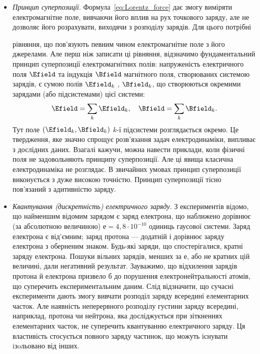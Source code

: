 \begin{itemize}

	\item \textit{Принцип суперпозиції}. Формула~\eqref{eq:Lorentz_force} дає змогу виміряти
	      електромагнітне поле, вивчаючи його вплив на рух точкового заряду, але не
	      дозволяє його розрахувати, виходячи з розподілу зарядів. Для цього потрібні

	      рівняння, що пов’язують певним чином електромагнітне поле з його
	      джерелами. Але перш ніж записати ці рівняння, відзначимо фундаментальний
	      принцип суперпозиції електромагнітних полів: напруженість електричного
	      поля $\Efield$ та індукція $\Bfield$ магнітного поля, створюваних системою зарядів, є сумою
	      полів $\Efield_k$ , $\Bfield_k$, що створюються окремими зарядами (або підсистемами) цієї
	      системи:
	      \begin{equation}
		      \Efield = \sum\limits_k \Efield_k, \quad \Bfield = \sum\limits_k \Bfield_k.
	      \end{equation}
	      Тут поле $(\Efield_k, \Bfield_k)$ $k$-ї підсистеми розглядається окремо.
	      Це твердження, яке значно спрощує розв’язання задач електродинаміки,
	      випливає з дослідних даних. Взагалі кажучи, можна навести приклади, коли
	      фізичні поля не задовольняють принципу суперпозиції. Але ці явища класична
	      електродинаміка не розглядає. В звичайних умовах принцип суперпозиції
	      виконується з дуже високою точністю. Принцип суперпозиції тісно пов’язаний
	      з адитивністю заряду.


	\item \textit{Квантування (дискретність) електричного заряду}. З експериментів відомо, що найменшим відомим зарядом є заряд електрона, що наближено
	      дорівнює (за абсолютною величиною) $е=4,8\cdot10^{-10}$ одиниць
	      гаусової системи. Заряд електрона є від’ємним; заряд протона --- додатній і дорівнює заряду електрона з оберненим знаком. Будь-які заряди, що
	      спостерігалися, кратні заряду електрона. Пошуки вільних зарядів, менших за е, або не кратних цій величині, дали негативний результат. Зауважимо, що
	      відхилення зарядів протона й електрона призвело б до порушення електронейтральності атомів, що суперечить експериментальним даним. Слід відзначити, що
	      сучасні експерименти дають змогу вивчати розподіл заряду всередині елементарних часток. Але наявність неперервного розподілу густини заряду всередині,
	      наприклад, протона чи нейтрона, яка досліджується при зіткненнях елементарних часток, не суперечить квантуванню електричного заряду. Ця властивість
	      стосується повного заряду частинок, що можуть існувати iзoльовано від інших.



\end{itemize}
